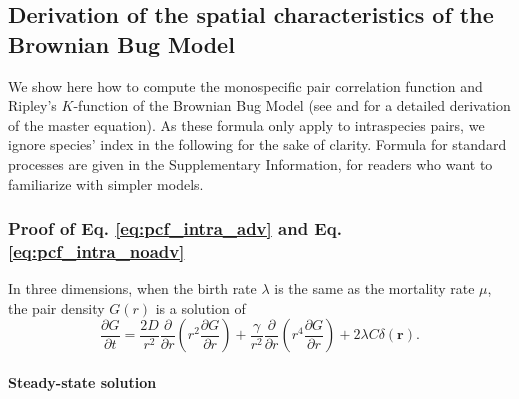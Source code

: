 \documentclass[english]{article}
\begin{document}
\renewcommand\thesection{A\arabic{section}}
\setcounter{section}{0}
\renewcommand\thefigure{A\arabic{figure}}
\setcounter{figure}{0}
\renewcommand\thetable{A\arabic{table}}

\subsection*{Derivation of the spatial characteristics of the Brownian Bug Model}

We show here how to compute the monospecific pair correlation function
and Ripley's $K$-function of the Brownian Bug Model (see \citealp{young_reproductive_2001}
and \citealp{picoche_rescience_2022} for a detailed derivation of
the master equation). As these formula only apply to intraspecies
pairs, we ignore species' index in the following for the sake of clarity.
Formula for standard processes are given in the Supplementary Information,
for readers who want to familiarize with simpler models.

\subsubsection*{Proof of Eq. \ref{eq:pcf_intra_adv} and Eq. \ref{eq:pcf_intra_noadv}}

In three dimensions, when the birth rate $\lambda$ is the same as
the mortality rate $\mu$, the pair density $G(r)$ is a solution
of
\begin{equation}
\frac{\partial G}{\partial t}=\frac{2D}{r^{2}}\frac{\partial}{\partial r}\left(r^{2}\frac{\partial G}{\partial r}\right)+\frac{\gamma}{r^{2}}\frac{\partial}{\partial r}\left(r^{4}\frac{\partial G}{\partial r}\right)+2\lambda C\delta(\boldsymbol{r}).\label{eq:Young3D-1}
\end{equation}

\paragraph*{Steady-state solution}
\end{document}
